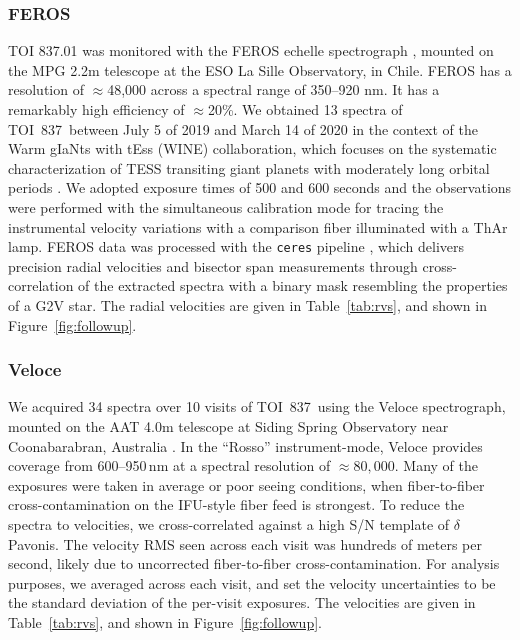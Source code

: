 \documentclass[12pt,twocolumn,tighten]{aastex63}
\newcommand{\tn}{TOI~837} %
\begin{document}
\subsubsection{FEROS}
TOI 837.01 was monitored with the FEROS echelle spectrograph
\citep{kaufer_commissioning_1999}, mounted on the MPG 2.2m telescope
at the ESO La Sille Observatory, in Chile. FEROS has a resolution of
$\approx$48,000 across a spectral range of 350–920 nm. It has a
remarkably high efficiency of $\approx$20\%. We obtained 13 spectra of
\tn\ between July 5 of 2019 and March 14 of 2020 in the context of the
Warm gIaNts with tEss (WINE) collaboration, which focuses on the
systematic characterization of TESS transiting giant planets with
moderately long orbital periods \citep[{\it
e.g.},][]{brahm:2019,jordan:2020}.  We adopted exposure times of 500
and 600 seconds and the observations were performed with the
simultaneous calibration mode for tracing the instrumental velocity
variations with a comparison fiber illuminated with a ThAr lamp. FEROS
data was processed with the \texttt{ceres} pipeline
\citep{brahm_2017_ceres}, which delivers precision radial velocities
and bisector span measurements through cross-correlation of the
extracted spectra with a binary mask resembling the properties of a
G2V star. The radial velocities are given in Table~\ref{tab:rvs},
and shown in Figure~\ref{fig:followup}.




\subsubsection{Veloce}
We acquired 34 spectra over 10 visits of \tn\ using the Veloce
spectrograph, mounted on the AAT 4.0m telescope at Siding Spring
Observatory near Coonabarabran, Australia \citep{gilbert_veloce_2018}.
In the ``Rosso'' instrument-mode, Veloce provides coverage from
600--950$\,$nm at a spectral resolution of $\approx 80{,}000$.  Many
of the exposures were taken in average or poor seeing conditions, when
fiber-to-fiber cross-contamination on the IFU-style fiber feed is
strongest.  To reduce the spectra to velocities, we cross-correlated
against a high S/N template of $\delta$ Pavonis.  The velocity RMS
seen across each visit was hundreds of meters per second, likely due
to uncorrected fiber-to-fiber cross-contamination.  For analysis
purposes, we averaged across each visit, and set the velocity
uncertainties to be the standard deviation of the per-visit exposures.
The velocities are given in Table~\ref{tab:rvs}, and shown in
Figure~\ref{fig:followup}.
\end{document}
